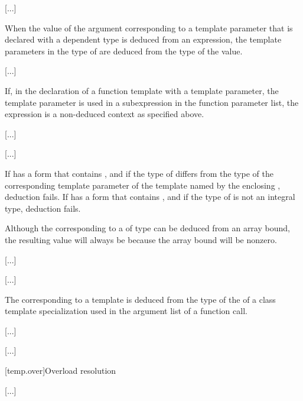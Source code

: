 \documentclass{wg21}
\begin{document}
\textcolor{noteclr}{[...]}

\pnum
When the value of the argument
corresponding to a  template parameter 
that is declared with a dependent type
is deduced from an expression,
the template parameters in the type of 
are deduced from the type of the value.

\textcolor{noteclr}{[...]}

\pnum
\begin{note}
If, in the declaration of a function template with a 
template parameter, the  template parameter
is used in a subexpression in the function parameter list,
the expression is a non-deduced context as specified above.
\begin{example}
    \textcolor{noteclr}{[...]}
\end{example}
\end{note}

\textcolor{noteclr}{[...]}

\pnum
If  has a form that contains , and
if the type of  differs from the type
of the corresponding template parameter
of the template named by the enclosing ,
deduction fails.
If  has a form that contains \tcode{[i]}, and if the type of
 is not an integral type, deduction fails.
\begin{wfootnote}
Although the
corresponding to a
of type
can be deduced from an array bound, the resulting value will always be
because the array bound will be nonzero.
\end{wfootnote}
\textcolor{noteclr}{[...]}

\textcolor{noteclr}{[...]}

\pnum
The
corresponding to a template
is deduced from the type of the
of a class template specialization used in the argument list of a function call.
\begin{example}
    \textcolor{noteclr}{[...]}
\end{example}

\textcolor{noteclr}{[...]}

[temp.over]{Overload resolution}

\textcolor{noteclr}{[...]}
\end{document}
